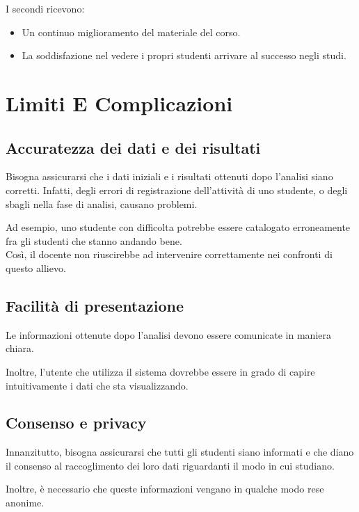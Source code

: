 I secondi ricevono:

\begin{itemize}

\item Un continuo miglioramento del materiale del corso.
\item La soddisfazione nel vedere i propri studenti arrivare al successo negli studi.

\cite{iadlearning2}

\end{itemize}

\section{Limiti E Complicazioni}

\subsection{Accuratezza dei dati e dei risultati}

Bisogna assicurarsi che i dati iniziali e i risultati ottenuti dopo l'analisi siano corretti. 
Infatti, degli errori di registrazione dell'attività di uno studente, o degli sbagli nella fase di analisi, causano problemi.

Ad esempio, uno studente con difficolta potrebbe essere catalogato erroneamente fra gli studenti che stanno andando bene. \\
Così, il docente non riuscirebbe ad intervenire correttamente nei confronti di questo allievo.

\subsection{Facilità di presentazione}

Le informazioni ottenute dopo l'analisi devono essere comunicate in maniera chiara.

Inoltre, l'utente che utilizza il sistema dovrebbe essere in grado di capire intuitivamente i dati che sta visualizzando.

\subsection{Consenso e privacy}

Innanzitutto, bisogna assicurarsi che tutti gli studenti siano informati e che diano il consenso al raccoglimento dei loro dati riguardanti il modo in cui studiano.

Inoltre, è necessario che queste informazioni vengano in qualche modo rese anonime.

